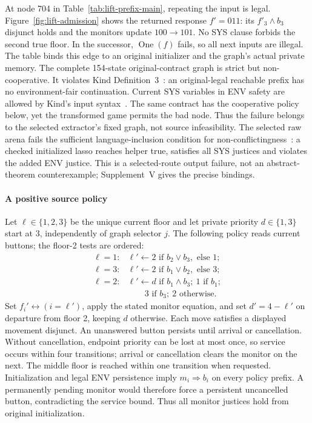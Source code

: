 
At node 704 in Table~\ref{tab:lift-prefix-main}, repeating the input is legal.
Figure~\ref{fig:lift-admission} shows the returned response $f'=011$:
its $f'_3\land b_3$ disjunct holds and the monitors update $100\to101$.
No SYS clause forbids the second true floor. In the successor,
$\operatorname{One}(f)$ fails, so all next inputs are illegal.
The table binds this edge to an original initializer and the graph's
actual private memory. The complete 154-state original-contract graph
is strict but non-cooperative. It violates Kind Definition~3~\cite[Sec.~4]{kind}:
an original-legal reachable prefix has no environment-fair continuation.
Current SYS variables in ENV safety are allowed by Kind's input
syntax~\cite[Sec.~3.1]{kind}. The same contract has the cooperative policy
below, yet the transformed game permits the bad node. Thus the failure
belongs to the selected extractor's fixed graph, not source infeasibility.
The selected raw arena fails the sufficient
language-inclusion condition for non-conflictingness~\cite[Eq.~(13c),
Theorem~3]{friendly}: a checked initialized lasso reaches helper true,
satisfies all SYS justices and violates the added ENV justice. This is a
selected-route output failure, not an abstract-theorem counterexample;
Supplement~V gives the precise bindings.

\paragraph{A positive source policy}
Let $\ell\in\{1,2,3\}$ be the unique current floor and let private
priority $d\in\{1,3\}$ start at 3, independently of graph selector $j$.
The following policy reads current buttons; the floor-2 tests are ordered:
\[
\begin{array}{ll}
\ell=1:&\ell'\gets2\text{ if }b_2\lor b_3,\text{ else }1;\\
\ell=3:&\ell'\gets2\text{ if }b_1\lor b_2,\text{ else }3;\\
\ell=2:&\ell'\gets d\text{ if }b_1\land b_3;\ 1\text{ if }b_1;\\
       &\qquad 3\text{ if }b_3;\ 2\text{ otherwise}.
\end{array}
\]
Set $f_i'\leftrightarrow(i=\ell')$, apply the stated monitor equation,
and set $d'=4-\ell'$ on departure from floor 2, keeping $d$ otherwise.
Each move satisfies a displayed movement disjunct. An unanswered button
persists until arrival or cancellation. Without cancellation, endpoint
priority can be lost at most once, so service occurs within four
transitions; arrival or cancellation clears the monitor on the next.
The middle floor is reached within one transition when requested.
Initialization and legal ENV persistence imply $m_i\Rightarrow b_i$
on every policy prefix. A permanently pending monitor would therefore
force a persistent uncancelled button, contradicting the service bound.
Thus all monitor justices hold from original initialization.

